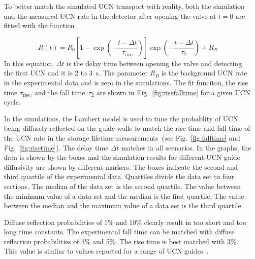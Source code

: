 
To better match the simulated UCN transport with reality, both the
simulation and the measured UCN rate in the detector after opening the
valve at $t=0$ are fitted with the function

\begin{equation}
R(t) = R_0 \left[ 1 - \exp \left( -\frac{t - \Delta t}{\tau_\mathrm{rise}} \right) \right] \exp \left( -\frac{t - \Delta t}{\tau_2} \right) + R_B
\end{equation}
In this equation, $\Delta t$ is the delay time between opening the
valve and detecting the first UCN and it is 2 to 3~s. The parameter
$R_B$ is the background UCN rate in the experimental data and is zero
in the simulations. The fit funciton, the rise time
$\tau_{\mathrm{rise}}$, and the fall time~$\tau_2$ are shown in
Fig.~\ref{fig:risefalltime} for a given UCN cycle.

In the simulations, the Lambert model is used to tune the probablity
of UCN being diffusely reflected on the guide walls to match the rise
time and fall time of the UCN rate in the storage lifetime
measurements~(see Fig.~\ref{fig:falltime} and
Fig.~\ref{fig:risetime}).  The delay time $\Delta t$ matches in all
scenarios.  In the graphs, the data is shown by the boxes and the
simulation results for different UCN guide diffusivity are shown by
different markers. The boxes indicate the second and third quartile of
the experimental data. Quartiles divide the data set to four
sections. The median of the data set is the second quartile. The value
between the minimum value of a data set and the median is the first
quartile. The value between the median and the maximum value of a data
set is the third quartile.

Diffuse reflection probabilities of 1\% and 10\% clearly result in too
short and too long time constants. The experimental fall time can be
matched with diffuse reflection probabilities of 3\% and 5\%. The rise
time is best matched with 3\%. This value is similar to values
reported for a range of UCN
guides~\cite{DAUM201471,Wlokka2017,Atchison2010}.


